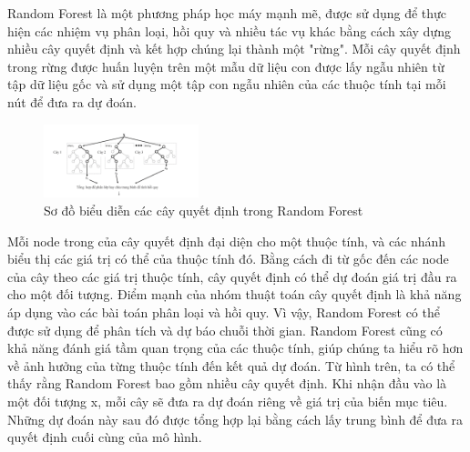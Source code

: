 Random Forest là một phương pháp học máy mạnh mẽ, được sử dụng để thực hiện các nhiệm vụ phân loại, hồi quy và nhiều tác vụ khác bằng cách xây dựng nhiều cây quyết định và kết hợp chúng lại thành một "rừng". Mỗi cây quyết định trong rừng được huấn luyện trên một mẫu dữ liệu con được lấy ngẫu nhiên từ tập dữ liệu gốc và sử dụng một tập con ngẫu nhiên của các thuộc tính tại mỗi nút để đưa ra dự đoán.

\begin{figure}[htbp]
\centerline{\includegraphics[width=0.4\textwidth]{img/RF.png}}
\caption{Sơ đồ biểu diễn các cây quyết định trong Random Forest}
\label{fig}
\end{figure}

Mỗi node trong của cây quyết định đại diện cho một thuộc tính, và các nhánh biểu thị các giá trị có thể của thuộc tính đó. Bằng cách đi từ gốc đến các node của cây theo các giá trị thuộc tính, cây quyết định có thể dự đoán giá trị đầu ra cho một đối tượng. Điểm mạnh của nhóm thuật toán cây quyết định là khả năng áp dụng vào các bài toán phân loại và hồi quy. Vì vậy, Random Forest có thể được sử dụng để phân tích và dự báo chuỗi thời gian. Random Forest cũng có khả năng đánh giá tầm quan trọng của các thuộc tính, giúp chúng ta hiểu rõ hơn về ảnh hưởng của từng thuộc tính đến kết quả dự đoán. Từ hình trên, ta có thể thấy rằng Random Forest bao gồm nhiều cây quyết định. Khi nhận đầu vào là một đối tượng x, mỗi cây sẽ đưa ra dự đoán riêng về giá trị của biến mục tiêu. Những dự đoán này sau đó được tổng hợp lại bằng cách lấy trung bình để đưa ra quyết định cuối cùng của mô hình.


